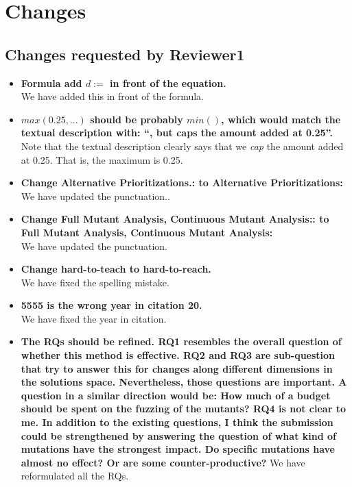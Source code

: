 \documentclass[11pt]{article}
\begin{document}
\section{Changes}
\subsection{Changes requested by Reviewer1}
\begin{itemize}
\item \textbf{Formula add $d:=$ in front of the equation.} \\
We have added this in front of the formula.

\item \textbf{$max(0.25, ...)$ should be probably $min()$, which would match the
textual description with: ``, but caps the amount added at 0.25''.}\\
Note that the textual description clearly says that we \emph{cap} the amount
added at 0.25. That is, the maximum is 0.25.
\item \textbf{Change Alternative Prioritizations.: to Alternative
Prioritizations:}\\
We have updated the punctuation..

\item \textbf{Change Full Mutant Analysis, Continuous Mutant Analysis:: to Full Mutant
Analysis, Continuous Mutant Analysis:}\\
We have updated the punctuation.

\item \textbf{Change hard-to-teach to hard-to-reach.}\\
We have fixed the spelling mistake.

\item \textbf{5555 is the wrong year in citation 20.}\\
We have fixed the year in citation.

\item \textbf{
The RQs should be refined. RQ1 resembles the overall question of whether this
method is effective. RQ2 and RQ3 are sub-question that try to answer this for
changes along different dimensions in the solutions space. Nevertheless, those
questions are important. A question in a similar direction would be: How much of
a budget should be spent on the fuzzing of the mutants?
RQ4 is not clear to me.
In addition to the existing questions, I think the submission could be
strengthened by answering the question of what kind of mutations have the
strongest impact. Do specific mutations have almost no effect? Or are some
counter-productive?
}
We have reformulated all the RQs.


\end{itemize}
\end{document}
